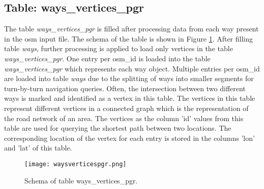 \subsection{Table: ways{\_}vertices{\_}pgr}
The table \textit{ways{\_}vertices{\_}pgr} is filled after processing data from each way present in the osm input file. The schema of the table is shown in Figure \ref{fg:waysverticespgr}. After filling table \textit{ways}, further processing is applied to load only vertices in the table \textit{ways{\_}vertices{\_}pgr}. One entry per osm{\_}id is loaded into the table \textit{ways{\_}vertices{\_}pgr} which represents each way object. Multiple entries per osm{\_}id are loaded into table \textit{ways} due to the splitting of ways into smaller segments for turn-by-turn navigation queries. Often, the intersection between two different ways is marked and identified as a vertex in this table. The vertices in this table represent different vertices in a connected graph which is the representation of the road network of an area. The vertices as the column 'id' values from this table are used for querying the shortest path between two locations. The corresponding location of the vertex for each entry is stored in the columns 'lon' and 'lat' of this table.
\begin{figure}
\centering
\texttt{[image: waysverticespgr.png]}
\caption{Schema of table ways{\_}vertices{\_}pgr.}
\label{fg:waysverticespgr}
\end{figure}




